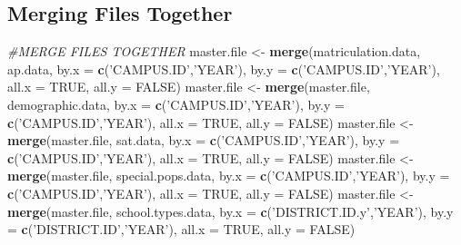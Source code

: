 \documentclass[
]{article}
\newenvironment{Shaded}{\begin{snugshade}}{\end{snugshade}}
\newcommand{\CommentTok}[1]{\textcolor[rgb]{0.56,0.35,0.01}{\textit{#1}}}
\newcommand{\DataTypeTok}[1]{\textcolor[rgb]{0.13,0.29,0.53}{#1}}
\newcommand{\KeywordTok}[1]{\textcolor[rgb]{0.13,0.29,0.53}{\textbf{#1}}}
\newcommand{\NormalTok}[1]{#1}
\newcommand{\OtherTok}[1]{\textcolor[rgb]{0.56,0.35,0.01}{#1}}
\newcommand{\StringTok}[1]{\textcolor[rgb]{0.31,0.60,0.02}{#1}}
\begin{document}
\hypertarget{merging-files-together}{%
\subsection{Merging Files Together}\label{merging-files-together}}

\begin{Shaded}
\begin{Highlighting}[]
\CommentTok{#MERGE FILES TOGETHER}
\NormalTok{master.file <-}\StringTok{ }\KeywordTok{merge}\NormalTok{(matriculation.data, ap.data, }\DataTypeTok{by.x =} \KeywordTok{c}\NormalTok{(}\StringTok{'CAMPUS.ID'}\NormalTok{,}\StringTok{'YEAR'}\NormalTok{), }
                     \DataTypeTok{by.y =} \KeywordTok{c}\NormalTok{(}\StringTok{'CAMPUS.ID'}\NormalTok{,}\StringTok{'YEAR'}\NormalTok{), }\DataTypeTok{all.x =} \OtherTok{TRUE}\NormalTok{, }\DataTypeTok{all.y =} \OtherTok{FALSE}\NormalTok{)}
\NormalTok{master.file <-}\StringTok{ }\KeywordTok{merge}\NormalTok{(master.file, demographic.data, }\DataTypeTok{by.x =} \KeywordTok{c}\NormalTok{(}\StringTok{'CAMPUS.ID'}\NormalTok{,}\StringTok{'YEAR'}\NormalTok{),}
                     \DataTypeTok{by.y =} \KeywordTok{c}\NormalTok{(}\StringTok{'CAMPUS.ID'}\NormalTok{,}\StringTok{'YEAR'}\NormalTok{), }\DataTypeTok{all.x =} \OtherTok{TRUE}\NormalTok{, }\DataTypeTok{all.y =} \OtherTok{FALSE}\NormalTok{)}
\NormalTok{master.file <-}\StringTok{ }\KeywordTok{merge}\NormalTok{(master.file, sat.data, }\DataTypeTok{by.x =} \KeywordTok{c}\NormalTok{(}\StringTok{'CAMPUS.ID'}\NormalTok{,}\StringTok{'YEAR'}\NormalTok{),}
                     \DataTypeTok{by.y =} \KeywordTok{c}\NormalTok{(}\StringTok{'CAMPUS.ID'}\NormalTok{,}\StringTok{'YEAR'}\NormalTok{), }\DataTypeTok{all.x =} \OtherTok{TRUE}\NormalTok{, }\DataTypeTok{all.y =} \OtherTok{FALSE}\NormalTok{)}
\NormalTok{master.file <-}\StringTok{ }\KeywordTok{merge}\NormalTok{(master.file, special.pops.data, }\DataTypeTok{by.x =} \KeywordTok{c}\NormalTok{(}\StringTok{'CAMPUS.ID'}\NormalTok{,}\StringTok{'YEAR'}\NormalTok{),}
                     \DataTypeTok{by.y =} \KeywordTok{c}\NormalTok{(}\StringTok{'CAMPUS.ID'}\NormalTok{,}\StringTok{'YEAR'}\NormalTok{), }\DataTypeTok{all.x =} \OtherTok{TRUE}\NormalTok{, }\DataTypeTok{all.y =} \OtherTok{FALSE}\NormalTok{)}
\NormalTok{master.file <-}\StringTok{ }\KeywordTok{merge}\NormalTok{(master.file, school.types.data, }\DataTypeTok{by.x =} \KeywordTok{c}\NormalTok{(}\StringTok{'DISTRICT.ID.y'}\NormalTok{,}\StringTok{'YEAR'}\NormalTok{),}
                     \DataTypeTok{by.y =} \KeywordTok{c}\NormalTok{(}\StringTok{'DISTRICT.ID'}\NormalTok{,}\StringTok{'YEAR'}\NormalTok{), }\DataTypeTok{all.x =} \OtherTok{TRUE}\NormalTok{, }\DataTypeTok{all.y =} \OtherTok{FALSE}\NormalTok{)}
\end{Highlighting}
\end{Shaded}
\end{document}
